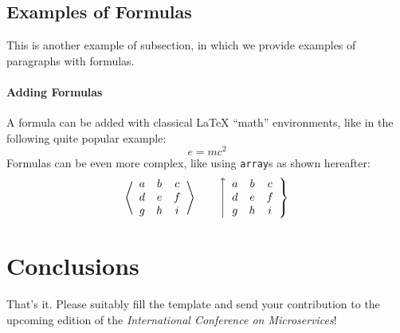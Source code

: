 \documentclass{mc-abstract}
\begin{document}
\subsection{Examples of Formulas}
This is another example of subsection, in which we provide examples of paragraphs with formulas.

\paragraph{Adding Formulas}
A formula can be added with classical \LaTeX{} \enquote{math} environments, like in the following quite popular example: 
$$ e = mc^2 $$
Formulas can be even more complex, like using \texttt{array}s as shown hereafter:
\[
\left\langle
\begin{array}{ccc}
a & b & c \\ d & e & f \\ g & h & i 
\end{array}
\right\rangle
\qquad
\left\uparrow
\begin{array}{ccc}
a & b & c \\
d & e & f \\
g & h & i 
\end{array}
\right\}
\]

\section{Conclusions}
That's it. Please suitably fill the template and send your contribution to the upcoming edition of the \textit{International Conference on Microservices}! \Smiley




\end{document}
